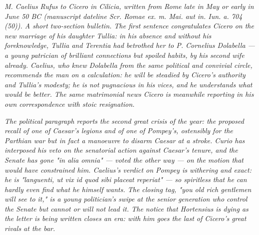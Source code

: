 
\textit{M. Caelius Rufus to Cicero in Cilicia, written from
Rome late in May or early in June 50 BC (manuscript dateline
\textit{Scr. Romae ex. m. Mai. aut in. Iun. a. 704 (50)}).
A short two-section bulletin. The first sentence congratulates
Cicero on the new marriage of his daughter Tullia: in his
absence and without his foreknowledge, Tullia and Terentia
had betrothed her to P. Cornelius Dolabella --- a young
patrician of brilliant connections but spoiled habits, by
his second wife already. Caelius, who knew Dolabella from
the same political and convivial circle, recommends the man
on a calculation: he will be steadied by Cicero's authority
and Tullia's modesty; he is not pugnacious in his vices, and
he understands what would be better. The same matrimonial
news Cicero is meanwhile reporting in his own correspondence
with stoic resignation.}

\textit{The political paragraph reports the second great
crisis of the year: the proposed recall of one of Caesar's
legions and of one of Pompey's, ostensibly for the Parthian
war but in fact a manoeuvre to disarm Caesar at a stroke.
Curio has interposed his veto on the senatorial action
against Caesar's tenure, and the Senate has gone "in alia
omnia" --- voted the other way --- on the motion that would
have constrained him. Caelius's verdict on Pompey is
withering and exact: he is "languenti, ut vix id quod sibi
placeat reperiat" --- so spiritless that he can hardly even
find what he himself wants. The closing tag, "you old rich
gentlemen will see to it," is a young politician's swipe
at the senior generation who control the Senate but cannot
or will not lead it. The notice that Hortensius is dying as
the letter is being written closes an era: with him goes the
last of Cicero's great rivals at the bar.}
